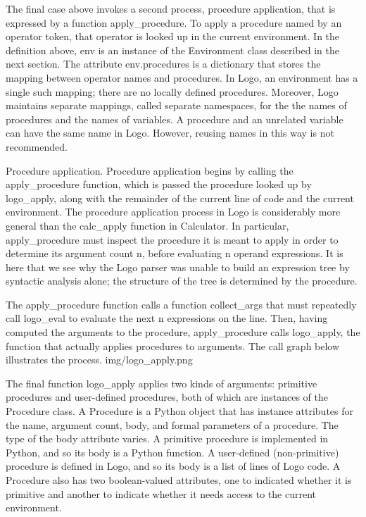 \documentclass[letterpaper,10pt,dvipdfmx]{sphinxmanual}
\begin{document}
The final case above invokes a second process, procedure application, that is expressed by a function apply\_procedure. To apply a procedure named by an operator token, that operator is looked up in the current environment. In the definition above, env is an instance of the Environment class described in the next section. The attribute env.procedures is a dictionary that stores the mapping between operator names and procedures. In Logo, an environment has a single such mapping; there are no locally defined procedures. Moreover, Logo maintains separate mappings, called separate namespaces, for the the names of procedures and the names of variables. A procedure and an unrelated variable can have the same name in Logo. However, reusing names in this way is not recommended.

Procedure application. Procedure application begins by calling the apply\_procedure function, which is passed the procedure looked up by logo\_apply, along with the remainder of the current line of code and the current environment. The procedure application process in Logo is considerably more general than the calc\_apply function in Calculator. In particular, apply\_procedure must inspect the procedure it is meant to apply in order to determine its argument count n, before evaluating n operand expressions. It is here that we see why the Logo parser was unable to build an expression tree by syntactic analysis alone; the structure of the tree is determined by the procedure.

The apply\_procedure function calls a function collect\_args that must repeatedly call logo\_eval to evaluate the next n expressions on the line. Then, having computed the arguments to the procedure, apply\_procedure calls logo\_apply, the function that actually applies procedures to arguments. The call graph below illustrates the process.
img/logo\_apply.png

The final function logo\_apply applies two kinds of arguments: primitive procedures and user-defined procedures, both of which are instances of the Procedure class. A Procedure is a Python object that has instance attributes for the name, argument count, body, and formal parameters of a procedure. The type of the body attribute varies. A primitive procedure is implemented in Python, and so its body is a Python function. A user-defined (non-primitive) procedure is defined in Logo, and so its body is a list of lines of Logo code. A Procedure also has two boolean-valued attributes, one to indicated whether it is primitive and another to indicate whether it needs access to the current environment.
\end{document}
